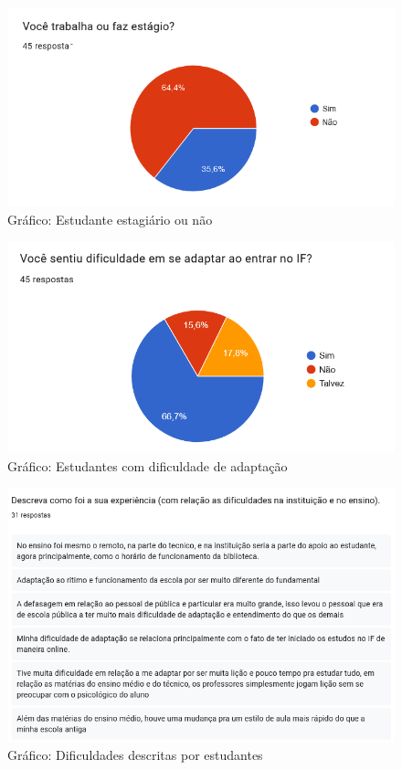 \begin{figure}[htb]
\centering
\caption{Gráfico: Estudante estagiário ou não}
\label{Grafico estagio}
\includegraphics[width=1.0\textwidth]{anexos/Imagens_PesquisaAceitacao/p3.png}
\end{figure}
\FloatBarrier

\begin{figure}[htb]
\centering
\caption{Gráfico: Estudantes com dificuldade de adaptação}
\label{Grafico adaptacao}
\includegraphics[width=1.0\textwidth]{anexos/Imagens_PesquisaAceitacao/p4.png}
\end{figure}
\FloatBarrier

\begin{figure}[htb]
\centering
\caption{Gráfico: Dificuldades descritas por estudantes}
\label{Grafico descricao dificuldades}
\includegraphics[width=1.0\textwidth]{anexos/Imagens_PesquisaAceitacao/p05.png}
\end{figure}
\FloatBarrier

